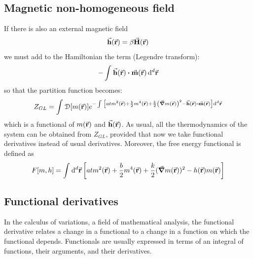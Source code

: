 \documentclass[../main/main.tex]{subfiles}
\begin{document}
\subsection{Magnetic non-homogeneous field}
If there is also an external magnetic field
\begin{equation*}
  \va{h} ( \va{r}) = \beta \va{H} ( \va{r})
\end{equation*}
we must add to the Hamiltonian the term (Legendre transform):
\begin{equation*}
  - \int_{}^{}  \va{h} (\va{r}) \vdot \va{m} (\va{r}) \dd[d]{\va{r}}
\end{equation*}
so that the partition function becomes:
\begin{equation}
  Z_{GL} = \int_{}^{} \mathcal{D} \qty[m(\va{r})]  e^{-   \int_{}^{}  \qty[a t m^2 (\va{r}) + \frac{b}{2} m^4 (\va{r}) + \frac{k}{2} \qty(\va{\grad } m (\va{r}))^2 -  \va{h} (\va{r}) \vdot \va{m} (\va{r}) ] \dd[d]{\va{r}}   }
\end{equation}
which is a functional of \( m(\va{r}) \)  and \( \va{h}(\va{r}) \). As usual, all the thermodynamics of the system can be obtained from  \( Z_{GL} \), provided that now we take functional derivatives instead of usual derivatives.
Moreover, the free energy functional is defined as
\begin{equation}
  F [m,h] = \int_{}^{} \dd[d]{\va{r}} \qty[a t m^2 (\va{r}) + \frac{b}{2} m^4 (\va{r}) + \frac{k}{2} (\va{\grad }  m (\va{r}))^2 - h(\va{r})m(\va{r})]
  \label{eq:17_10}
\end{equation}


\subsection{Functional derivatives}
In the calculus of variations, a field of mathematical analysis, the functional derivative relates a change in a functional to a change in a function on which the functional depends. Functionals are usually expressed in terms of an integral of functions, their arguments, and their derivatives.
\end{document}
